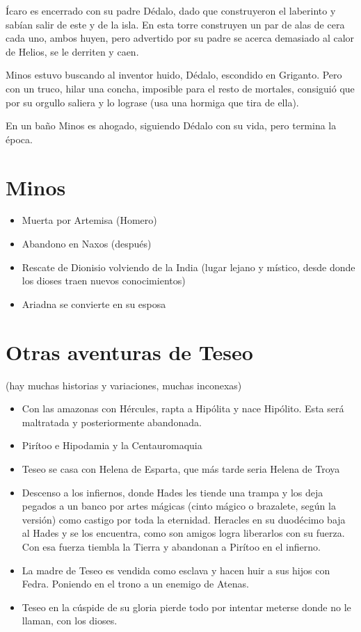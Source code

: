 Ícaro es encerrado con su padre Dédalo, dado que construyeron el laberinto y sabían salir de este y de la isla. En esta torre construyen un par de alas de cera cada uno, ambos huyen, pero advertido por su padre se acerca demasiado al calor de Helios, se le derriten y caen.

Minos estuvo buscando al inventor huido, Dédalo, escondido en Griganto. Pero con un truco, hilar una concha, imposible para el resto de mortales, consiguió que por su orgullo saliera y lo lograse (usa una hormiga que tira de ella).

En un baño Minos es ahogado, siguiendo Dédalo con su vida, pero termina la época.

\section{Minos}
\begin{itemize}
	\item Muerta por Artemisa (Homero)
	\item Abandono en Naxos (después)
	\item Rescate de Dionisio volviendo de la India (lugar lejano y místico, desde donde los dioses traen nuevos conocimientos)
	\item Ariadna se convierte en su esposa
\end{itemize}

\section{Otras aventuras de Teseo }
 (hay muchas historias y variaciones, muchas inconexas)
\begin{itemize}
	\item Con las amazonas con Hércules, rapta a Hipólita y nace Hipólito. Esta será maltratada y posteriormente abandonada.
	\item Pirítoo e Hipodamia y la Centauromaquia
	\item Teseo se casa con Helena de Esparta, que más tarde seria Helena de Troya
	\item Descenso a los infiernos, donde Hades les tiende una trampa y los deja pegados a un banco por artes mágicas (cinto mágico o brazalete, según la versión) como castigo por toda la eternidad. Heracles en su duodécimo baja al Hades y se los encuentra, como son amigos logra liberarlos con su fuerza. Con esa fuerza tiembla la Tierra y abandonan a Pirítoo en el infierno.
	\item La madre de Teseo es vendida como esclava y hacen huir a sus hijos con Fedra. Poniendo en el trono a un enemigo de Atenas.
	\item Teseo en la cúspide de su gloria pierde todo por intentar meterse donde no le llaman, con los dioses.
\end{itemize}
